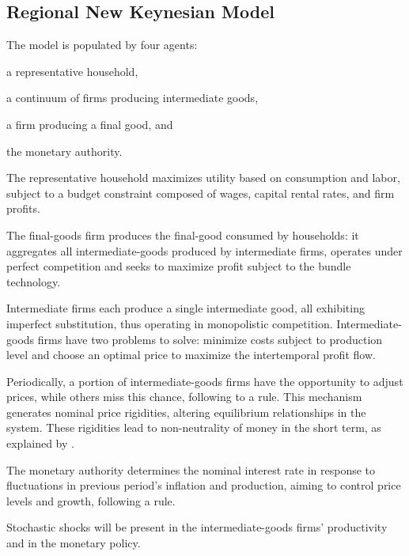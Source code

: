 \documentclass[../thesis.tex]{subfiles}
\begin{document}
\newpage


\subsection{Regional New Keynesian Model}\label{sec:nk-model}

	The model is populated by four agents: 
	\begin{enumerate*}[label=(\arabic*)]
	\item a representative household,
	\item a continuum of firms producing intermediate goods,
	\item a firm producing a final good, and
	\item the monetary authority.
	\end{enumerate*}

	The representative household maximizes utility based on consumption and labor, subject to a budget constraint composed of wages, capital rental rates, and firm profits.
	
	The final-goods firm produces the final-good consumed by households: it aggregates all intermediate-goods produced by intermediate firms, operates under perfect competition and seeks to maximize profit subject to the bundle technology.
	
	Intermediate firms each produce a single intermediate good, all exhibiting imperfect substitution, thus operating in monopolistic competition. Intermediate-goods firms have two problems to solve: minimize costs subject to production level and choose an optimal price to maximize the intertemporal profit flow.
	
	Periodically, a portion of intermediate-goods firms have the opportunity to adjust prices, while others miss this chance, following to a \textcite{calvo_staggered_1983} rule. This mechanism generates nominal price rigidities, altering equilibrium relationships in the system. These rigidities lead to non-neutrality of money in the short term, as explained by \textcite[p.191]{costa_junior_understanding_2016}.
	
	The monetary authority determines the nominal interest rate in response to fluctuations in previous period's inflation and production, aiming to control price levels and growth, following a \textcite{taylor_discretion_1993} rule.
	
	Stochastic shocks will be present in the intermediate-goods firms' productivity and in the monetary policy.
	
\end{document}

